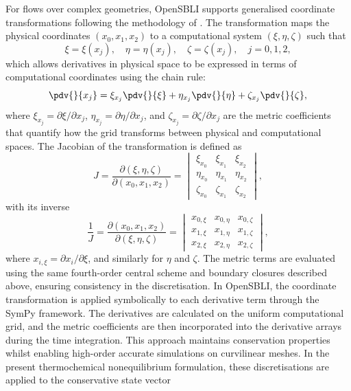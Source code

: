 For flows over complex geometries, OpenSBLI supports generalised coordinate transformations following the methodology of \cite{ZhangZhang2022}. The transformation maps the physical coordinates $(x_0, x_1, x_2)$ to a computational system $(\xi, \eta, \zeta)$ such that
\begin{equation}
    \xi = \xi(x_j), \quad \eta = \eta(x_j), \quad \zeta = \zeta(x_j), \quad j = 0, 1, 2,
\end{equation}
which allows derivatives in physical space to be expressed in terms of computational coordinates using the chain rule:
\begin{equation}
    \pdv{}{x_j} = \xi_{x_j} \pdv{}{\xi} + \eta_{x_j} \pdv{}{\eta} + \zeta_{x_j} \pdv{}{\zeta},
\end{equation}
where $\xi_{x_j} = \partial\xi/\partial x_j$, $\eta_{x_j} = \partial\eta/\partial x_j$, and $\zeta_{x_j} = \partial\zeta/\partial x_j$ are the metric coefficients that quantify how the grid transforms between physical and computational spaces. The Jacobian of the transformation is defined as
\begin{equation}
    J = \frac{\partial(\xi, \eta, \zeta)}{\partial(x_0, x_1, x_2)} = 
    \begin{vmatrix}
        \xi_{x_0} & \xi_{x_1} & \xi_{x_2} \\
        \eta_{x_0} & \eta_{x_1} & \eta_{x_2} \\
        \zeta_{x_0} & \zeta_{x_1} & \zeta_{x_2}
    \end{vmatrix},
\end{equation}
with its inverse
\begin{equation}
    \frac{1}{J} = \frac{\partial(x_0, x_1, x_2)}{\partial(\xi, \eta, \zeta)} = 
    \begin{vmatrix}
        x_{0,\xi} & x_{0,\eta} & x_{0,\zeta} \\
        x_{1,\xi} & x_{1,\eta} & x_{1,\zeta} \\
        x_{2,\xi} & x_{2,\eta} & x_{2,\zeta}
    \end{vmatrix},
\end{equation}
where $x_{i,\xi} = \partial x_i/\partial\xi$, and similarly for $\eta$ and $\zeta$. The metric terms are evaluated using the same fourth-order central scheme and boundary closures described above, ensuring consistency in the discretisation. In OpenSBLI, the coordinate transformation is applied symbolically to each derivative term through the SymPy framework. The derivatives are calculated on the uniform computational grid, and the metric coefficients are then incorporated into the derivative arrays during the time integration. This approach maintains conservation properties whilst enabling high-order accurate simulations on curvilinear meshes. In the present thermochemical nonequilibrium formulation, these discretisations are applied to the conservative state vector
